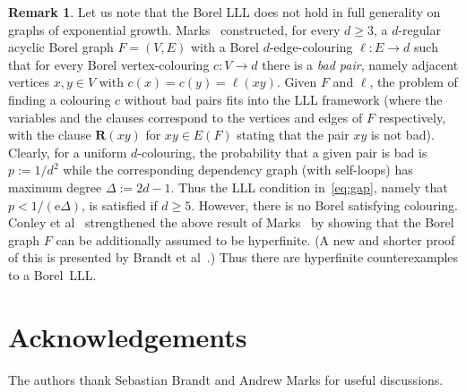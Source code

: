 \documentclass[12pt,a4paper]{article}
\numberwithin{equation}{section}
\theoremstyle{definition}
\newtheorem{remark}[equation]{Remark}
\renewcommand{\ge}{\geqslant}
\newcommand{\me}{\mathrm{e}}
\begin{document}
    \begin{remark}\label{rem:noborel} 
    Let us note that the Borel LLL does not hold in full generality on graphs of exponential growth.  Marks~\cite{Marks16} constructed, for every $d\ge 3$, a $d$-regular acyclic Borel graph $F=(V,E)$ with a Borel $d$-edge-colouring $\ell:E\to d$ such that for every Borel vertex-colouring  $c:V\to d$ there is a \emph{bad pair}, namely  adjacent vertices $x,y\in V$ with $c(x)=c(y)=\ell(xy)$. Given $F$ and $\ell$, the problem of finding a colouring $c$ without bad pairs fits into the LLL framework (where the variables and the clauses correspond to the vertices and edges of $F$ respectively, with the clause $\mathbf R(xy)$ for $xy\in E(F)$ stating that the pair $xy$ is not bad). 
    Clearly, for a uniform $d$-colouring, the probability that a given pair is bad is $p:=1/d^2$ while the corresponding dependency graph (with self-loops) has maximum degree $\Delta:=2d-1$. Thus the LLL condition in~\eqref{eq:gap}, namely that $p<1/(\me\Delta)$, is satisfied if $d\ge 5$.  However, there is no Borel satisfying colouring.  
    Conley et al~\cite{ConleyJacksonMarksSewardTuckerdrob20} strengthened the above result of Marks~\cite{Marks16} by showing that the Borel graph $F$ can be additionally assumed to be hyperfinite. (A new and shorter proof of this is presented by Brandt et al~\cite{BCGGRV}.) Thus there are hyperfinite counterexamples to a Borel~LLL. 
    \end{remark}
    
    
    \section*{Acknowledgements}
    
    The authors thank Sebastian Brandt and Andrew Marks for useful discussions.
    
    
    
\end{document}
